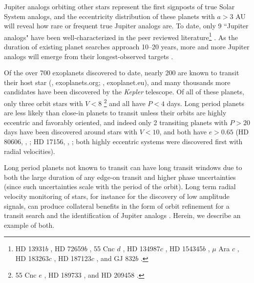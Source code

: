 Jupiter analogs orbiting other stars represent the first signposts of
true Solar System analogs, and the eccentricity distribution of these
planets with $a>3$ AU will reveal how rare or frequent true Jupiter
analogs are. To date, only 9 ``Jupiter analogs" have been
well-characterized in the peer reviewed literature\footnote{HD
  13931$b$ \citep{2010ApJ...721.1467H}, HD 72659$b$
  \citep{2011A&A...527A..63M}, 55 Cnc $d$ \citep{2002ApJ...581.1375M},
  HD 134987$c$ \citep{2010MNRAS.403.1703J}, HD 154345$b$ \citep[but
    with possibility of being an activity cycle-induced
    signal]{2008ApJ...683L..63W}, $\mu$ Ara $c$
  \citep{2007A&A...462..769P}, HD 183263$c$
  \citep{2009ApJ...693.1084W}, HD 187123$c$
  \citep{2009ApJ...693.1084W}, and GJ 832$b$
  \citep{2009ApJ...690..743B}.}  \citep[defined here as $P > 8$ years,
  $4 > M\sin{i} > 0.5\ \mjup$, and $e <
  0.3$;][exoplanets.org]{wrighteod}. As the duration of existing
planet searches approach 10--20 years, more and more Jupiter analogs
will emerge from their longest-observed targets
\citep{2012arXiv1205.2765W, 2012arXiv1205.5835B}.

Of the over 700 exoplanets discovered to date, nearly 200 are known to
transit their host star (\citealt{wrighteod}, exoplanets.org;
  \citealt{2011A&A...532A..79S}, exoplanet.eu), and many thousands more
candidates have been discovered by the {\it Kepler} telescope.  Of all
of these planets, only three orbit stars with $V<8$
\footnote{55 Cnc $e$ \citep{2004ApJ...614L..81M, 2011A&A...533A.114D},
  HD 189733 \citep{2005A&A...444L..15B}, and HD 209458
  \citep{2000ApJ...529L..41H, 2000ApJ...529L..45C}.}  and all have $P
< 4$ days.  Long period planets are less likely than close-in planets
to transit unless their orbits are highly eccentric and favorably
oriented, and indeed only 2 transiting planets with $P>20$ days have
been discovered around stars with $V<10$, and both have $e > 0.65$ (HD
  80606, \citealt{2009Natur.457..562L}, \citealt{2009MNRAS.396L..16F}; HD
  17156, \citealt{2007ApJ...669.1336F}, \citealt{2007A&A...476L..13B}; both
  highly eccentric systems were discovered first with radial
  velocities).

Long period planets not known to transit can have long transit windows
due to both the large duration of any edge-on transit and higher phase
uncertainties (since such uncertainties scale with the period of the
orbit). Long term radial velocity monitoring of stars, for instance
for the discovery of low amplitude signals, can produce collateral
benefits in the form of orbit refinement for a transit search and the
identification of Jupiter analogs
\citep[e.g.,][]{2009ApJ...693.1084W}. Herein, we describe an example
of both.

